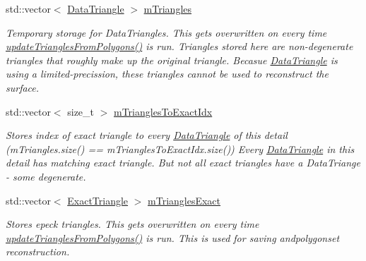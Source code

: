 \begin{DoxyCompactItemize}
\item 
\mbox{\label{classpepr3d_1_1_triangle_detail_a4739e317a83230e718680cabf62a4e59}} 
std\+::vector$<$ \mbox{\hyperlink{classpepr3d_1_1_data_triangle}{Data\+Triangle}} $>$ \mbox{\hyperlink{classpepr3d_1_1_triangle_detail_a4739e317a83230e718680cabf62a4e59}{m\+Triangles}}
\begin{DoxyCompactList}\small\item\em Temporary storage for Data\+Triangles. This gets overwritten on every time \mbox{\hyperlink{classpepr3d_1_1_triangle_detail_a55836364f8bca5dce29da4a7320adf65}{update\+Triangles\+From\+Polygons()}} is run. Triangles stored here are non-\/degenerate triangles that roughly make up the original triangle. Becasue \mbox{\hyperlink{classpepr3d_1_1_data_triangle}{Data\+Triangle}} is using a limited-\/precission, these triangles cannot be used to reconstruct the surface. \end{DoxyCompactList}\item 
\mbox{\label{classpepr3d_1_1_triangle_detail_aa8ffb6f58e83ec892a8cd9d82d3e9054}} 
std\+::vector$<$ size\+\_\+t $>$ \mbox{\hyperlink{classpepr3d_1_1_triangle_detail_aa8ffb6f58e83ec892a8cd9d82d3e9054}{m\+Triangles\+To\+Exact\+Idx}}
\begin{DoxyCompactList}\small\item\em Stores index of exact triangle to every \mbox{\hyperlink{classpepr3d_1_1_data_triangle}{Data\+Triangle}} of this detail (m\+Triangles.\+size() == m\+Triangles\+To\+Exact\+Idx.\+size()) Every \mbox{\hyperlink{classpepr3d_1_1_data_triangle}{Data\+Triangle}} in this detail has matching exact triangle. But not all exact triangles have a Data\+Triange -\/ some degenerate. \end{DoxyCompactList}\item 
\mbox{\label{classpepr3d_1_1_triangle_detail_a6816ebdc0f458261f4f73e24c599bbdd}} 
std\+::vector$<$ \mbox{\hyperlink{structpepr3d_1_1_triangle_detail_1_1_exact_triangle}{Exact\+Triangle}} $>$ \mbox{\hyperlink{classpepr3d_1_1_triangle_detail_a6816ebdc0f458261f4f73e24c599bbdd}{m\+Triangles\+Exact}}
\begin{DoxyCompactList}\small\item\em Stores epeck triangles. This gets overwritten on every time \mbox{\hyperlink{classpepr3d_1_1_triangle_detail_a55836364f8bca5dce29da4a7320adf65}{update\+Triangles\+From\+Polygons()}} is run. This is used for saving andpolygonset reconstruction. \end{DoxyCompactList}\item 

\end{DoxyCompactItemize}
